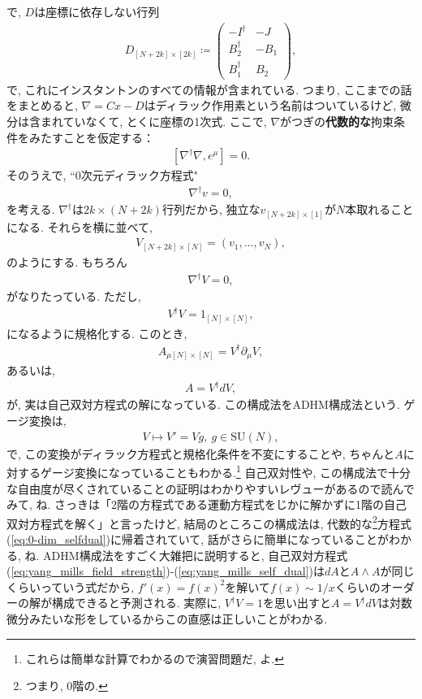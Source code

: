 \documentclass{ltjsarticle}
\theoremstyle{definition}
\begin{document}
で, $D$は座標に依存しない行列
\begin{gather}
  D_{[N+2k]\times[2k]}\coloneqq
  \begin{pmatrix}
    -I^\dagger&-J\\
    B_2^\dagger&-B_1\\
    B_1^\dagger&B_2
  \end{pmatrix},
\end{gather}
で, これにインスタントンのすべての情報が含まれている. つまり, ここまでの話をまとめると, $\nabla=Cx-D$はディラック作用素という名前はついているけど, 微分は含まれていなくて, とくに座標の1次式. ここで, $\nabla$がつぎの\textbf{代数的な}拘束条件をみたすことを仮定する：
\begin{gather}
  \left[\nabla^\dagger\nabla,e^\mu\right]=0.\label{eq:0-dim_selfdual}
\end{gather}
そのうえで, ``0次元ディラック方程式"
\begin{gather}
  \nabla^\dagger v=0,
\end{gather}
を考える. $\nabla^\dagger$は$2k\times(N+2k)$行列だから, 独立な$v_{[N+2k]\times[1]}$が$N$本取れることになる. それらを横に並べて,
\begin{gather}
  V_{[N+2k]\times[N]}=\left(v_1,\dots,v_N\right),
\end{gather}
のようにする. もちろん
\begin{gather}
  \nabla^\dagger V=0,\label{eq:adhm_v_orthogonality}
\end{gather}
がなりたっている. ただし,
\begin{gather}
  V^\dagger V=1_{[N]\times[N]},\label{eq:adhm_v_normalisation}
\end{gather}
になるように規格化する. このとき,
\begin{gather}
  A_{\mu[N]\times[N]}=V^\dagger\partial_\mu V,
\end{gather}
あるいは,
\begin{gather}
  A=V^\dagger dV,
\end{gather}
が, 実は自己双対方程式の解になっている. この構成法をADHM構成法という. ゲージ変換は,
\begin{gather}
  V\mapsto V'=Vg,\ g\in\mathrm{SU}(N),
\end{gather}
で, この変換がディラック方程式と規格化条件を不変にすることや, ちゃんと$A$に対するゲージ変換になっていることもわかる.\footnote{これらは簡単な計算でわかるので演習問題だ, よ.} 自己双対性や, この構成法で十分な自由度が尽くされていることの証明はわかりやすいレヴュー\cite{adhm_review}があるので読んでみて, ね. さっきは「2階の方程式である運動方程式をじかに解かずに1階の自己双対方程式を解く」と言ったけど, 結局のところこの構成法は, 代数的な\footnote{つまり, 0階の.}方程式(\ref{eq:0-dim_selfdual})に帰着されていて, 話がさらに簡単になっていることがわかる, ね. ADHM構成法をすごく大雑把に説明すると, 自己双対方程式(\ref{eq:yang_mills_field_strength})-(\ref{eq:yang_mills_self_dual})は$dA$と$A\wedge A$が同じくらいっていう式だから, $f'(x)=f(x)^2$を解いて$f(x)\sim1/x$くらいのオーダーの解が構成できると予測される. 実際に, $V^\dagger V=1$を思い出すと$A=V^\dagger dV$は対数微分みたいな形をしているからこの直感は正しいことがわかる.\par
\end{document}
